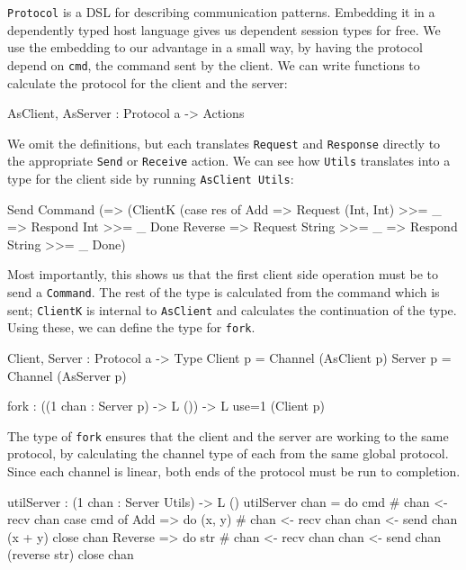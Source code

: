 \texttt{Protocol} is a DSL for describing communication
patterns. Embedding it in a dependently typed host language gives us
dependent session types for free. We use the embedding to our advantage 
in a small way, by having the protocol depend on \texttt{cmd}, the command
sent by the client.
%
We can write functions to calculate the protocol for the client and the
server: 

\begin{code}
AsClient, AsServer : Protocol a -> Actions
\end{code}

We omit the definitions, but each translates \texttt{Request} and
\texttt{Response} directly to the appropriate \texttt{Send} or
\texttt{Receive} action.
We can see how \texttt{Utils} translates into a type for the client side by
running \texttt{AsClient Utils}:

\begin{code}
Send Command (\res => (ClientK 
    (case res of 
          Add => Request (Int, Int) >>= \_ => 
                 Respond Int >>= \_ Done
          Reverse => Request String >>= \_ => 
                     Respond String >>= \_ Done)
\end{code}

Most importantly, this shows us that the first client side operation must be
to send a \texttt{Command}. The rest of the type is calculated from the
command which is sent; \texttt{ClientK} is internal to \texttt{AsClient} and
calculates the continuation of the type. Using these, we can
define the type for \texttt{fork}.

\begin{code}
Client, Server : Protocol a -> Type
Client p = Channel (AsClient p)
Server p = Channel (AsServer p)

fork : ((1 chan : Server p) -> L ()) -> L {use=1} (Client p)
\end{code}

The type of \texttt{fork} ensures that the client and the server are working
to the same protocol, by calculating the channel type of each from the same
global protocol. Since each channel is linear, both ends of the protocol
must be run to completion.

\begin{code}[float=h,frame=single,caption={An implementation of a server
for the \texttt{Utils} protocol},label=utilserver]
utilServer : (1 chan : Server Utils) -> L ()
utilServer chan
    = do cmd # chan <- recv chan
         case cmd of
              Add => do (x, y) # chan <- recv chan
                        chan <- send chan (x + y)
                        close chan
              Reverse => do str # chan <- recv chan
                            chan <- send chan (reverse str)
                            close chan
\end{code}

